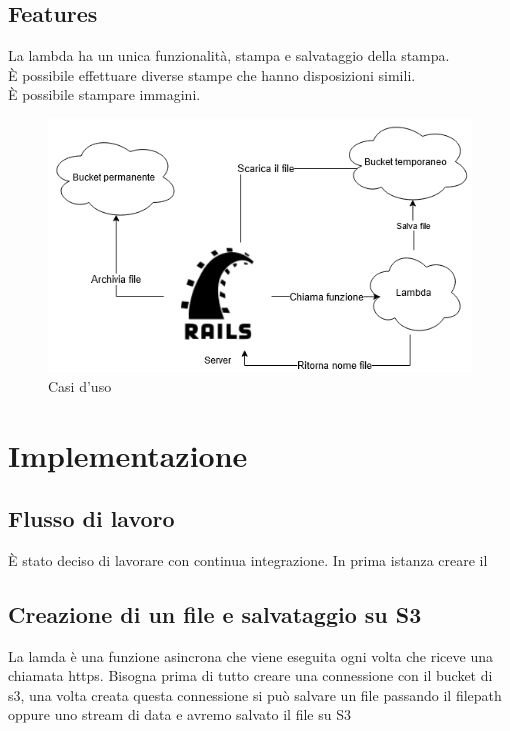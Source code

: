 \documentclass[12pt]{article}
\begin{document}
\subsection{Features}
La lambda ha un unica funzionalità, stampa e salvataggio della stampa.
\\ È possibile effettuare diverse stampe che hanno disposizioni simili.
\\ È possibile stampare immagini. 

\begin{figure}[H]
\includegraphics[scale = 0.6]{useCases.png}
\caption{Casi d'uso}
\label{fig:mesh2}
\end{figure}



\section{Implementazione}
\subsection{Flusso di lavoro}
È stato deciso di lavorare con continua integrazione. In prima istanza creare 
il 

\subsection{Creazione di un file e salvataggio su S3}
La lamda è una funzione asincrona che viene eseguita ogni volta che riceve una
chiamata https. Bisogna prima di tutto creare una connessione con il bucket di s3,
una volta creata questa connessione si può salvare un file passando il filepath
oppure uno stream di data e avremo salvato il file su S3
\end{document}
